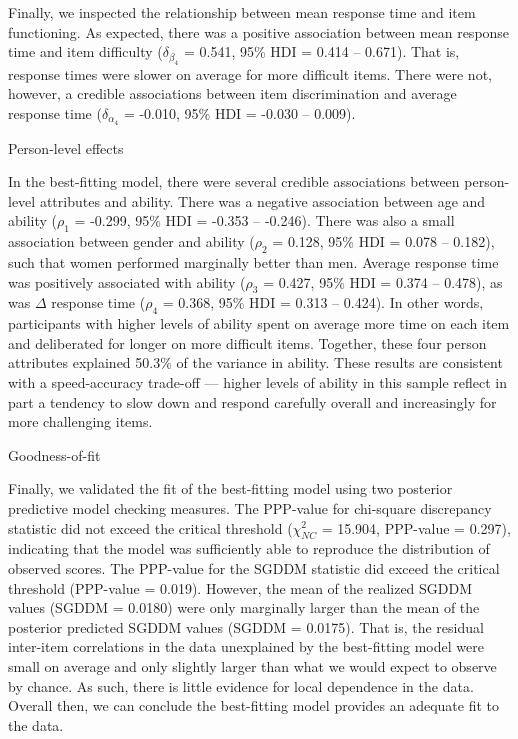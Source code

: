 \documentclass[a4paper,man,natbib]{apa6}
\makeatletter
\renewcommand{\subsubsection}{\@startsection{subsubsection}{3}
  {\z@}%
  {\b@level@two@skip}{\e@level@two@skip}%
  {\normalfont\normalsize\bfseries}}
\makeatother
\begin{document}
Finally, we inspected the relationship between mean response time and item functioning. As expected, there was a positive association between mean response time and item difficulty ($\delta_{\beta_4}$ = 0.541, 95\% HDI = 0.414 -- 0.671). That is, response times were slower on average for more difficult items. There were not, however, a credible associations between item discrimination and average response time ($\delta_{\alpha_4}$ = -0.010, 95\% HDI = -0.030 -- 0.009).

\subsubsection{Person-level effects}

In the best-fitting model, there were several credible associations between person-level attributes and ability. There was a negative association between age and ability ($\rho_1$ = -0.299, 95\% HDI = -0.353 -- -0.246). There was also a small association between gender and ability ($\rho_2$ = 0.128, 95\% HDI = 0.078 -- 0.182), such that women performed marginally better than men. Average response time was positively associated with ability ($\rho_3$ = 0.427, 95\% HDI = 0.374 -- 0.478), as was $\Delta$ response time ($\rho_4$ = 0.368, 95\% HDI = 0.313 -- 0.424). In other words, participants with higher levels of ability spent on average more time on each item and deliberated for longer on more difficult items. Together, these four person attributes explained 50.3\% of the variance in ability. These results are consistent with a speed-accuracy trade-off --- higher levels of ability in this sample reflect in part a tendency to slow down and respond carefully overall and increasingly for more challenging items.  

\subsubsection{Goodness-of-fit}

Finally, we validated the fit of the best-fitting model using two posterior predictive model checking measures. The PPP-value for chi-square discrepancy statistic did not exceed the critical threshold ($\chi^2_{NC}$ = 15.904, PPP-value = 0.297), indicating that the model was sufficiently able to reproduce the distribution of observed scores. The PPP-value for the SGDDM statistic did exceed the critical threshold (PPP-value = 0.019). However, the mean of the realized SGDDM values (SGDDM = 0.0180) were only marginally larger than the mean of the posterior predicted SGDDM values (SGDDM = 0.0175). That is, the residual inter-item correlations in the data unexplained by the best-fitting model were small on average and only slightly larger than what we would expect to observe by chance. As such, there is little evidence for local dependence in the data. Overall then, we can conclude the best-fitting model provides an adequate fit to the data.
\end{document}
